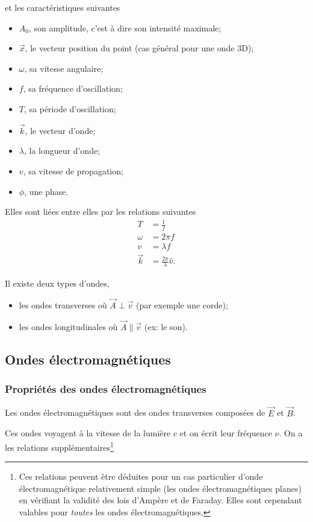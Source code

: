 et les caractéristiques suivantes
\begin{itemize}
  \item $A_0$, son amplitude, c'est à dire son intensité maximale;
  \item $\vec{x}$, le vecteur position du point (cas général pour une onde 3D);
  \item $\omega$, sa vitesse angulaire;
  \item $f$, sa fréquence d'oscillation;
  \item $T$, sa période d'oscillation;
  \item $\vec{k}$, le vecteur d'onde;
  \item $\lambda$, la longueur d'onde;
  \item $v$, sa vitesse de propagation;
  \item $\phi$, une phase.
\end{itemize}
Elles sont liées entre elles par les relations suivantes
\begin{align*}
  T & = \frac{1}{f}\\
  \omega & = 2\pi f\\
  v & = \lambda f\\
  \vec{k} & = \frac{2\pi}{\lambda}\hat{v}.
\end{align*}

Il existe deux types d'ondes,
\begin{itemize}
  \item les ondes transverses où $\vec{A} \perp \vec{v}$ (par exemple une corde);
  \item les ondes longitudinales où $\vec{A} \parallel \vec{v}$ (ex: le son).
\end{itemize}


\subsection{Ondes électromagnétiques}
\subsubsection{Propriétés des ondes électromagnétiques}
Les ondes électromagnétiques sont des ondes transverses composées
de $\vec{E}$ et $\vec{B}$.

Ces ondes voyagent à la vitesse de la lumière $c$
et on écrit leur fréquence $\nu$.
On a les relations supplémentaires\footnote{Ces relations peuvent 
être déduites pour un cas particulier d'onde 
électromagnétique relativement simple (les ondes électromagnétiques
planes) en vérifiant la validité des lois d'Ampère et de Faraday. 
Elles sont cependant valables pour \emph{toutes} les ondes
électromagnétiques.}

